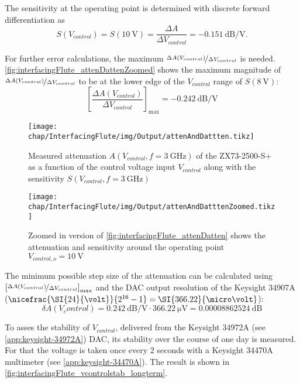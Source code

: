 The sensitivity at the operating point is determined with discrete forward differentiation as
\begin{equation}
S(V_{control})=S(\SI{10}{\volt})=\frac{\Delta A}{\Delta V_{control}} = \SI{-0.151}{\dB\per\volt}.
\end{equation}

For further error calculations, the maximum $\nicefrac{\Delta A(V_{control})}{\Delta V_{control}}$ is needed. \autoref{fig:interfacingFlute_attenDattenZoomed} shows the maximum magnitude of $\nicefrac{\Delta A(V_{control})}{\Delta V_{control}}$ to be at the lower edge of the $V_{control}$ range of $S(\SI{8}{\volt})$:
\begin{equation}
\left[\frac{\Delta A(V_{control})}{\Delta V_{control}}\right]_{\text{max}}=\SI{-0.242}{\dB\per\volt}
\end{equation}

\begin{figure}[tb]
	\centering
	\texttt{[image: chap/InterfacingFlute/img/Output/attenAndDattten.tikz]}
	\caption{Measured attenuation $A(V_{control},f=\SI{3}{\GHz})$ of the ZX73-2500-S+ as a function of the control voltage input $V_{control}$ along with the sensitivity $S(V_{control},f=\SI{3}{\GHz})$}
	\label{fig:interfacingFlute_attenDatten}
\end{figure}

\begin{figure}[tb]
	\centering
	\texttt{[image: chap/InterfacingFlute/img/Output/attenAndDatttenZoomed.tikz]}
	\caption{Zoomed in version of \autoref{fig:interfacingFlute_attenDatten} shows the attenuation and sensitivity around the operating point $V_{control,o}=\SI{10}{\volt}$}
	\label{fig:interfacingFlute_attenDattenZoomed}
\end{figure}

The minimum possible step size of the attenuation can be calculated using $\left[\nicefrac{\Delta A(V_{control})}{\Delta V_{control}}\right]_{\text{max}}$ and the DAC output resolution of the Keysight 34907A ($\nicefrac{\SI{24}{\volt}}{2^{16}-1}=\SI{366.22}{\micro\volt}$):
\begin{equation}
\delta A(V_control) = \SI{0.242}{\dB\per\volt} \cdot \SI{366.22}{\micro\volt} = \SI{0.00008862524}{\dB}
\end{equation}

To asses the stability of $V_{control}$, delivered from the Keysight 34972A (see \autoref{app:keysight-34972A}) DAC, its stability over the course of one day is measured. For that the voltage is taken once every 2 seconds with a Keysight 34470A multimeter (see \autoref{app:keysight-34470A}). The result is shown in \autoref{fig:interfacingFlute_vcontrolstab_longterm}.

